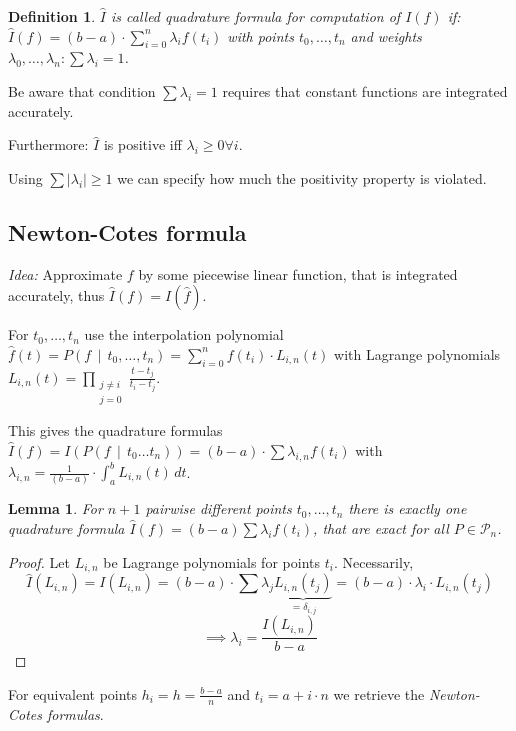 \documentclass[a4paper]{article}
\newcounter{lecref}[section]
\numberwithin{lecref}{section}
\theoremstyle{break}
\newtheorem{definition}[lecref]{Definition}
\newtheorem{lemma}[lecref]{Lemma}
\newcommand{\Abs}[1]{\left|#1\right|}
\begin{document}
\begin{definition}
  \label{definition:5-3}
  $\hat I$ is called \emph{quadrature formula} for computation of $I(f)$ if:
  $\hat I(f) = (b - a) \cdot \sum_{i=0}^{n} \lambda_i f(t_i)$ with points
  $t_0, \dots, t_n$ and weights $\lambda_0, \dots, \lambda_n: \sum \lambda_i = 1$.
\end{definition}

Be aware that condition $\sum \lambda_i = 1$ requires that constant functions are integrated accurately.

Furthermore: $\hat I$ is positive iff $\lambda_i \geq 0 \forall i$.

Using $\sum \Abs{\lambda_i} \geq 1$ we can specify how much the positivity property is violated.

\subsection{Newton-Cotes formula}
\label{sec:5-2}

\emph{Idea:} Approximate $f$ by some piecewise linear function, that is integrated accurately, thus $\hat I(f) = I(\hat f)$.

For $t_0, \dots, t_n$ use the interpolation polynomial $\hat f(t) = P(f \, \mid \, t_0, \dots, t_n) = \sum_{i=0}^n f(t_i) \cdot L_{i,n}(t)$ with Lagrange polynomials $L_{i,n}(t) = \prod_{\substack{j \neq i \\ j=0}} \frac{t - t_j}{t_i - t_j}$.

This gives the quadrature formulas $\hat I(f) = I(P(f \,\mid\, t_0 \dots t_n)) = (b - a) \cdot \sum \lambda_{i,n} f(t_i)$ with $\lambda_{i,n} = \frac{1}{(b-a)} \cdot \int_a^b L_{i,n}(t) \, dt$.

\begin{lemma}
  \label{lemma:5-4}
  For $n+1$ pairwise different points $t_0, \dots, t_n$ there is exactly one quadrature formula $\hat I(f) = (b - a) \sum \lambda_i f(t_i)$, that are exact for all $P \in \mathcal P_n$.
\end{lemma}

\begin{proof}
  Let $L_{i,n}$ be Lagrange polynomials for points $t_i$. Necessarily,
  \[ \hat I(L_{i,n}) = I(L_{i,n}) = (b-a) \cdot \sum \lambda_j \underbrace{L_{i,n}(t_j)}_{= \delta_{i,j}} = (b-a) \cdot \lambda_i \cdot L_{i,n}(t_j) \]
  \[ \implies \lambda_i = \frac{I(L_{i,n})}{b-a} \]
\end{proof}

For equivalent points $h_i = h = \frac{b-a}{n}$ and $t_i = a + i \cdot n$ we retrieve the \emph{Newton-Cotes formulas}.
\end{document}
